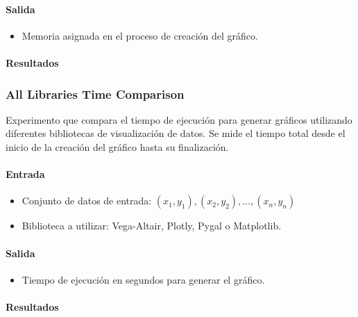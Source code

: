 \paragraph{Salida}
\begin{itemize}
    \item Memoria asignada en el proceso de creación del gráfico.
\end{itemize}

\paragraph{Resultados}
\vspace{0.5em}
\noindent

\AllLibrariesMemoryAllocation
\newpage

\subsubsection{All Libraries Time Comparison}
\label{all_libraries_time_comparison}

Experimento que compara el tiempo de ejecución para generar gráficos utilizando diferentes bibliotecas de visualización de datos. Se mide el tiempo total desde el inicio de la creación del gráfico hasta su finalización.

\paragraph{Entrada}
\begin{itemize}
    \item Conjunto de datos de entrada: \( (x_1, y_1), (x_2, y_2), \ldots, (x_n, y_n) \)
    \item Biblioteca a utilizar: Vega-Altair, Plotly, Pygal o Matplotlib.
\end{itemize}

\paragraph{Salida}
\begin{itemize}
    \item Tiempo de ejecución en segundos para generar el gráfico.
\end{itemize}

\paragraph{Resultados}
\vspace{0.5em}
\noindent

